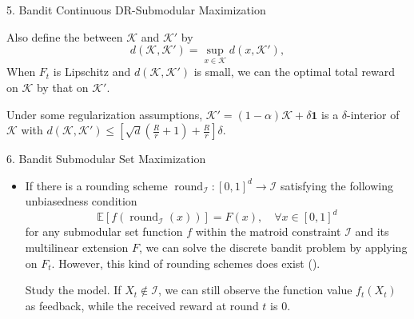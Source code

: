 \documentclass[final]{beamer}
\newcommand{\matroid}{\mathcal{I}}
\DeclareMathOperator{\round}{round}
\newcommand{\one}{\mathbf{1}}
\newcommand{\constraint}{\mathcal{K}}
\newlength{\onecolwid}
\begin{document}
\begin{frame}[t]
\begin{columns}[t]
\begin{column}{\onecolwid}
\begin{block}{5. Bandit Continuous DR-Submodular Maximization}
\begin{itemize}
%					
%					
%				
			
			Also define the  
			between $\constraint$ and $\constraint'$ by 
			\begin{equation*}
			d(\constraint,\constraint') = \sup_{x \in \constraint} 
			d(x,\constraint'),   
			\end{equation*}
			When $F_t$ is Lipschitz and 
			$d(\constraint,\constraint')$ is small, 
			we can  the optimal total reward on 
			$\constraint$ 
			by that on $\constraint'$. 
			
			 Under some regularization 
			assumptions, %
				$\constraint'=(1-\alpha)\constraint+\delta \one$  
				is a  $\delta$-interior of $\constraint$ with $d(\constraint, 
				\constraint') \leq [\sqrt{d}(\frac{R}{r}+1) + \frac{R}{r}] 
				\delta$. 
		\end{itemize}
%
%
%
%
	\end{block}
	

	
	\begin{block}{6. Bandit Submodular Set Maximization}
		\begin{itemize}
\item {} If there is a rounding 
scheme 
$ \round_\matroid:[0,1]^d \to \matroid $ satisfying the 
following unbiasedness condition
\begin{equation*}\label{eq:sampling_scheme}
\mathbb{E}[f(\round_\matroid(x))] = F(x),\quad \forall x\in [0,1]^d
\end{equation*}
for any submodular set function $ f $ within the matroid constraint $\matroid$ 
and its multilinear extension $ F $, we can solve the discrete bandit problem 
by applying 
 on $F_t$. However, this kind of rounding schemes 
does  exist ().


 Study the  model. 
If $X_t \notin \matroid$, 
we can still observe the function value $f_t(X_t)$ 
as feedback, while the received reward at round $t$ is $ 0 $. 
%
%
\end{itemize} 	
	\end{block}
	

\end{column}
\end{columns}
\end{frame}
\end{document}
